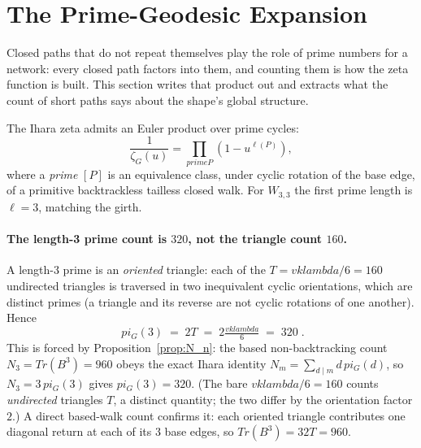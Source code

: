 \documentclass[12pt,a4paper]{article}
\def\mathrm#1{#1}%
\def\text#1{#1}%
\def\lambda{lambda}%
\def\pi{pi}%
\def\cdot{ }%
\theoremstyle{definition}
\renewcommand{\Tr}{\mathrm{Tr}}
\begin{document}
\section*{The Prime-Geodesic Expansion}

\begin{plainbox}
Closed paths that do not repeat themselves play the role of prime numbers for a
network: every closed path factors into them, and counting them is how the zeta function is
built. This section writes that product out and extracts what the count of short paths says
about the shape's global structure.
\end{plainbox}


The Ihara zeta admits an Euler product over prime cycles:
\[
\frac{1}{\zeta_G(u)} = \prod_{\text{prime } P} (1 - u^{\ell(P)}),
\]
where a \emph{prime} $[P]$ is an equivalence class, under cyclic rotation
of the base edge, of a primitive backtrackless tailless closed walk.  For
$W_{3,3}$ the first prime length is $\ell=3$, matching the girth.

\paragraph{The length-3 prime count is $320$, not the triangle count $160$.}
A length-3 prime is an \emph{oriented} triangle: each of the
$T = vk\lambda/6 = 160$ undirected triangles is traversed in two
inequivalent cyclic orientations, which are distinct primes (a triangle
and its reverse are not cyclic rotations of one another).  Hence
\[
\boxed{\;\pi_G(3) \;=\; 2T \;=\; 2\cdot\tfrac{vk\lambda}{6} \;=\; 320\;}.
\]
This is forced by Proposition~\ref{prop:N_n}: the based non-backtracking
count $N_3=\Tr(B^3)=960$ obeys the exact Ihara identity
$N_m = \sum_{d\mid m} d\,\pi_G(d)$, so $N_3 = 3\,\pi_G(3)$ gives
$\pi_G(3)=320$.  (The bare $vk\lambda/6=160$ counts \emph{undirected}
triangles $T$, a distinct quantity; the two differ by the orientation
factor $2$.)  A direct based-walk count confirms it: each oriented
triangle contributes one diagonal return at each of its $3$ base edges,
so $\Tr(B^3)=3\cdot 2T = 960$.
\end{document}
